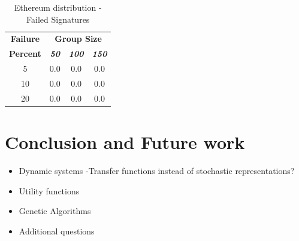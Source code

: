 \documentclass[conference]{IEEEtran}
\begin{document}
        \begin{table}[h!]
            \caption{Ethereum distribution - Failed Signatures}
            \begin{center}
            \begin{tabular}{|c|c|c|c|}
            \hline
            \textbf{Failure}&\multicolumn{3}{|c|}{\textbf{Group Size}} \\
            \cline{2-4} 
            \textbf{Percent} & \textbf{\textit{50}}& \textbf{\textit{100}}& \textbf{\textit{150}} \\
            \hline
            5 &  0.0 &  0.0 &  0.0 \\
            \hline
            10 &  0.0 &  0.0 &  0.0 \\
            \hline
            20 &  0.0 &  0.0 &  0.0 \\
            \hline
            \end{tabular}
            \label{failed_table2}
            \end{center}
        \end{table}


\newpage
\section{Conclusion and Future work}
\begin{itemize}
\item Dynamic systems -Transfer functions instead of stochastic representations?
\item Utility functions
\item Genetic Algorithms
\item Additional questions
\end{itemize}



\end{document}
